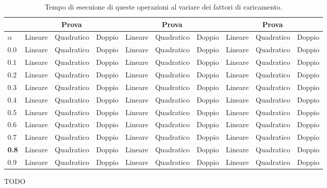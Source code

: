 \documentclass{article}
\begin{document}
\begin{center}
\begin{table}[H]
\begin{tabular}{l|l|l|l|l|l|l|l|l|l|}
\cline{2-10}
& \multicolumn{3}{c|}{Prova} & \multicolumn{3}{c|}{Prova} & \multicolumn{3}{c|}{Prova} \\
\hline
\multicolumn{1}{|l|}{$\alpha$} & Lineare & Quadratico & Doppio & Lineare & Quadratico & Doppio  & Lineare & Quadratico & Doppio \\
\hline
\multicolumn{1}{|l|}{0.0} & Lineare & Quadratico & Doppio & Lineare & Quadratico & Doppio  & Lineare & Quadratico & Doppio \\
\hline
\multicolumn{1}{|l|}{0.1} & Lineare & Quadratico & Doppio & Lineare & Quadratico & Doppio  & Lineare & Quadratico & Doppio \\
\hline
\multicolumn{1}{|l|}{0.2} & Lineare & Quadratico & Doppio & Lineare & Quadratico & Doppio  & Lineare & Quadratico & Doppio \\
\hline
\multicolumn{1}{|l|}{0.3} & Lineare & Quadratico & Doppio & Lineare & Quadratico & Doppio  & Lineare & Quadratico & Doppio \\
\hline
\multicolumn{1}{|l|}{0.4} & Lineare & Quadratico & Doppio & Lineare & Quadratico & Doppio  & Lineare & Quadratico & Doppio \\
\hline
\multicolumn{1}{|l|}{0.5} & Lineare & Quadratico & Doppio & Lineare & Quadratico & Doppio  & Lineare & Quadratico & Doppio \\
\hline
\multicolumn{1}{|l|}{0.6} & Lineare & Quadratico & Doppio & Lineare & Quadratico & Doppio  & Lineare & Quadratico & Doppio \\
\hline
\multicolumn{1}{|l|}{0.7} & Lineare & Quadratico & Doppio & Lineare & Quadratico & Doppio  & Lineare & Quadratico & Doppio \\
\hline
\multicolumn{1}{|l|}{\textbf{0.8}} & Lineare & Quadratico & Doppio & Lineare & Quadratico & Doppio  & Lineare & Quadratico & Doppio \\
\hline
\multicolumn{1}{|l|}{0.9} & Lineare & Quadratico & Doppio & Lineare & Quadratico & Doppio  & Lineare & Quadratico & Doppio \\
\hline
\end{tabular}
\label{tab:Confronto_tempi}
\caption{Tempo di esecuione di queste operazioni al variare dei fattori di caricamento.}
\end{table}
\end{center}


\begin{Huge}
TODO
\end{Huge}
\end{document}
